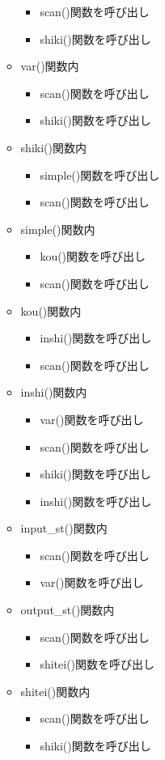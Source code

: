 \documentclass{jarticle}
\begin{document}
\begin{itemize}
\begin{itemize}
\begin{itemize}
      \item scan()関数を呼び出し
      \item shiki()関数を呼び出し
    \end{itemize}
    \item var()関数内
    \begin{itemize}
      \item scan()関数を呼び出し
      \item shiki()関数を呼び出し
    \end{itemize}
    \item shiki()関数内
    \begin{itemize}
      \item simple()関数を呼び出し
      \item scan()関数を呼び出し
    \end{itemize}
    \item simple()関数内
    \begin{itemize}
      \item kou()関数を呼び出し
      \item scan()関数を呼び出し
    \end{itemize}
    \item kou()関数内
    \begin{itemize}
      \item inshi()関数を呼び出し
      \item scan()関数を呼び出し
    \end{itemize}
    \item inshi()関数内
    \begin{itemize}
      \item var()関数を呼び出し
      \item scan()関数を呼び出し
      \item shiki()関数を呼び出し
      \item inshi()関数を呼び出し
    \end{itemize}
    \item input\_st()関数内
    \begin{itemize}
      \item scan()関数を呼び出し
      \item var()関数を呼び出し
    \end{itemize}
    \item output\_st()関数内
    \begin{itemize}
      \item scan()関数を呼び出し
      \item shitei()関数を呼び出し
    \end{itemize}
    \item shitei()関数内
    \begin{itemize}
      \item scan()関数を呼び出し
      \item shiki()関数を呼び出し
    \end{itemize}
  \end{itemize}
\end{itemize}
\end{document}
